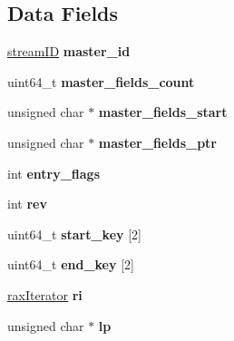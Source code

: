 \subsection*{Data Fields}
\begin{DoxyCompactItemize}
\item 
\mbox{\label{structstreamIterator_a077828904d5170a706d11e359a113b2c}} 
\hyperlink{structstreamID}{stream\+ID} {\bfseries master\+\_\+id}
\item 
\mbox{\label{structstreamIterator_a7ebd033efef3700f9cfd30cec1ae7b5a}} 
uint64\+\_\+t {\bfseries master\+\_\+fields\+\_\+count}
\item 
\mbox{\label{structstreamIterator_a4dce7f57ea419829ff66450b2ec02232}} 
unsigned char $\ast$ {\bfseries master\+\_\+fields\+\_\+start}
\item 
\mbox{\label{structstreamIterator_a960efaf69221907b9e794bac5b60d633}} 
unsigned char $\ast$ {\bfseries master\+\_\+fields\+\_\+ptr}
\item 
\mbox{\label{structstreamIterator_abd54a07f59d43756fc96c696cadf9210}} 
int {\bfseries entry\+\_\+flags}
\item 
\mbox{\label{structstreamIterator_a62f95467744a6bd25e61aa0688dd7e70}} 
int {\bfseries rev}
\item 
\mbox{\label{structstreamIterator_af9e2820f5296601ac2ae494894987879}} 
uint64\+\_\+t {\bfseries start\+\_\+key} \mbox{[}2\mbox{]}
\item 
\mbox{\label{structstreamIterator_a36a57435248ae3f7c858b8aa74818f2e}} 
uint64\+\_\+t {\bfseries end\+\_\+key} \mbox{[}2\mbox{]}
\item 
\mbox{\label{structstreamIterator_ac1891d8b9fb5bed1ceae47ebd6a23b4c}} 
\hyperlink{structraxIterator}{rax\+Iterator} {\bfseries ri}
\item 
\mbox{\label{structstreamIterator_a785e537f2475957006152dcfba73814c}} 
unsigned char $\ast$ {\bfseries lp}

\end{DoxyCompactItemize}
